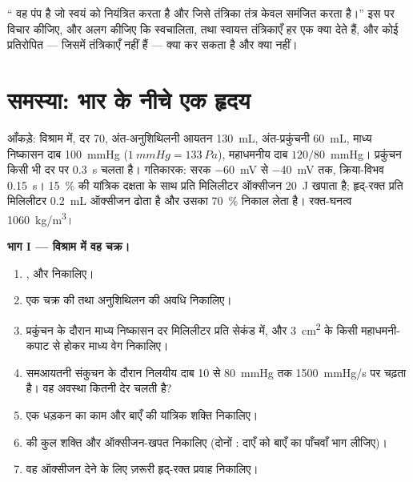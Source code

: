 \begin{exercise}[$\star\star\star$]\label{exo:b2:heart:12}
`` वह पंप है जो स्वयं को नियंत्रित करता है और जिसे तंत्रिका तंत्र
केवल समंजित करता है।'' इस पर विचार कीजिए, और अलग कीजिए कि स्वचालिता,
 तथा स्वायत्त तंत्रिकाएँ हर एक क्या देते हैं, और
कोई प्रतिरोपित  --- जिसमें तंत्रिकाएँ नहीं हैं --- क्या कर सकता है और क्या नहीं।
\end{exercise}

\section{समस्या: भार के नीचे एक हृदय}

\begin{problem}
\label{pb:b2:heart:1}
आँकड़े: विश्राम में, दर 70, अंत-अनुशिथिलनी आयतन \qty{130}{mL},
अंत-प्रकुंचनी \qty{60}{mL}, माध्य निष्कासन दाब \qty{100}{mmHg}
($\qty{1}{mmHg} = \qty{133}{Pa}$), महाधमनीय दाब $120/80$~mmHg।
प्रकुंचन किसी भी दर पर \qty{0.3}{s} चलता है। गतिकारक: सरक
\qty{-60}{mV} से \qty{-40}{mV} तक, क्रिया-विभव \qty{0.15}{s}।
 \qty{15}{\%} की यांत्रिक दक्षता के साथ प्रति मिलिलीटर ऑक्सीजन
\qty{20}{J} खपाता है; हृद्-रक्त प्रति मिलिलीटर
\qty{0.2}{mL} ऑक्सीजन ढोता है और  उसका
\qty{70}{\%} निकाल लेता है। रक्त-घनत्व \qty{1060}{kg/m^3}।

\medskip
\noindent\textbf{भाग I --- विश्राम में वह चक्र।}
\begin{enumerate}
  \item {},  और 
        निकालिए।
  \item एक चक्र की तथा अनुशिथिलन की अवधि निकालिए।
  \item प्रकुंचन के दौरान माध्य निष्कासन दर
        मिलिलीटर प्रति सेकंड में, और \qty{3}{cm^2} के किसी
        महाधमनी-कपाट से होकर माध्य वेग निकालिए।
  \item समआयतनी संकुचन के दौरान निलयीय दाब 10 से \qty{80}{mmHg} तक
        \qty{1500}{mmHg/s} पर चढ़ता है। वह अवस्था
        कितनी देर चलती है?
  \item एक धड़कन का काम और बाएँ  की यांत्रिक
        शक्ति निकालिए।
  \item {} की कुल शक्ति और ऑक्सीजन-खपत निकालिए
        (दोनों : दाएँ को बाएँ का पाँचवाँ भाग लीजिए)।
  \item वह ऑक्सीजन देने के लिए ज़रूरी हृद्-रक्त प्रवाह निकालिए।
\end{enumerate}


\end{problem}
